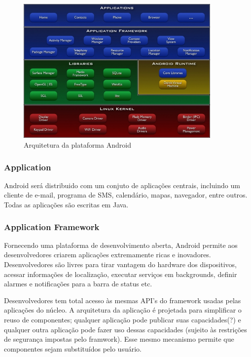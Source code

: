 \begin{figure}[h]
    \centering
    \includegraphics[width=10cm]{img/system-architecture.jpg}
    \caption{Arquitetura da plataforma Android}
    \label{system-architecture}
\end{figure}

\subsubsection{Application}
Android será distribuido com um conjuto de aplicações centrais, incluindo um cliente
de e-mail, programa de SMS, calendário, mapas, navegador, entre outros. Todas as 
aplicações são escritas em Java.

\subsubsection{Application Framework}
Fornecendo uma plataforma de desenvolvimento aberta, Android permite aos desenvolvedores
criarem aplicações extremamente ricas e inovadores. Desenvolvedores são livres para
tirar vantagem do hardware dos dispositivos, acessar informações de localização, 
executar serviços em backgrounds, definir alarmes e notificações para a barra de 
status etc.

Desenvolvedores tem total acesso às mesmas API's do framework usadas pelas aplicações 
do núcleo. A arquitetura da aplicação é projetada para simplificar o reuso de componentes;
qualquer aplicação pode publicar suas capacidades(?) e qualquer outra aplicação pode 
fazer uso dessas capacidades (sujeito às restrições de segurança impostas pelo 
framwork). Esse mesmo mecanismo permite que componentes sejam substituídos pelo 
usuário.

